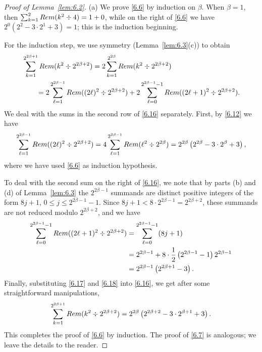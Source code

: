 \documentclass[10pt,a4paper]{amsart}
\begin{document}
\begin{proof}[Proof of Lemma~\ref{lem:6.2}]
(a) We prove \eqref{6.6} by induction on $\beta$. When $\beta=1$, then 
$\sum_{k=1}^2{\rm Rem}(k^2\div 4)=1+0$, while on the right of \eqref{6.6} we
have $2^0(2^2-3\cdot 2^1+3)=1$; this is the induction beginning. 

For the induction step, we use symmetry (Lemma~\ref{lem:6.3}(c)) to obtain
\begin{align}
&\sum_{k=1}^{2^{2\beta+1}}{\rm Rem}(k^2\div 2^{2\beta+2})
= 2\sum_{k=1}^{2^{2\beta}}{\rm Rem}(k^2\div 2^{2\beta+2})\label{6.16}\\
&\qquad=2\sum_{\ell=1}^{2^{2\beta-1}}{\rm Rem}((2\ell)^2\div 2^{2\beta+2})
+ 2\sum_{\ell=0}^{2^{2\beta-1}-1}{\rm Rem}((2\ell+1)^2\div 2^{2\beta+2}).\nonumber
\end{align}
We deal with the sums in the second row of \eqref{6.16} separately. First, by
\eqref{6.12} we have
\begin{equation}\label{6.17}
\sum_{\ell=1}^{2^{2\beta-1}}{\rm Rem}((2\ell)^2\div 2^{2\beta+2})
= 4\sum_{\ell=1}^{2^{2\beta-1}}{\rm Rem}(\ell^2\div 2^{2\beta})
= 2^{2\beta}\left(2^{2\beta}-3\cdot 2^{\beta}+3\right),
\end{equation}
where we have used \eqref{6.6} as induction hypothesis.

To deal with the second sum on the right of \eqref{6.16}, we note that by parts 
(b) and (d) of Lemma~\ref{lem:6.3} the $2^{2\beta-1}$ summands are distinct 
positive integers of the form $8j+1$, $0\leq j\leq 2^{2\beta-1}-1$. Since
$8j+1 < 8\cdot 2^{2\beta-1} = 2^{2\beta+2}$, these summands are not reduced
modulo $2^{2\beta+2}$, and we have
\begin{align}
\sum_{\ell=0}^{2^{2\beta-1}-1}{\rm Rem}((2\ell+1)^2\div 2^{2\beta+2})
&= \sum_{\ell=0}^{2^{2\beta-1}-1}(8j+1) \label{6.18}\\
&= 2^{2\beta-1}+8\cdot\frac{1}{2}\left(2^{2\beta-1}-1\right)2^{2\beta-1}\nonumber \\
&= 2^{2\beta-1}\left(2^{2\beta+1}-3\right).\nonumber
\end{align}
Finally, substituting \eqref{6.17} and \eqref{6.18} into \eqref{6.16}, we get 
after some straightforward manipulations,
\[
\sum_{k=1}^{2^{2\beta+1}}{\rm Rem}(k^2\div 2^{2\beta+2})
= 2^{2\beta}\left(2^{2\beta+2}-3\cdot 2^{\beta+1}+3\right).
\]
This completes the proof of \eqref{6.6} by induction. The proof of \eqref{6.7}
is analogous; we leave the details to the reader.


\end{proof}
\end{document}
